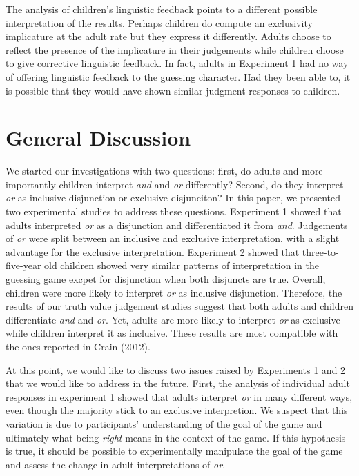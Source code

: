 \documentclass[10pt, letterpaper]{article}
\begin{document}
The analysis of children's linguistic feedback points to a different
possible interpretation of the results. Perhaps children do compute an
exclusivity implicature at the adult rate but they express it
differently. Adults choose to reflect the presence of the implicature in
their judgements while children choose to give corrective linguistic
feedback. In fact, adults in Experiment 1 had no way of offering
linguistic feedback to the guessing character. Had they been able to, it
is possible that they would have shown similar judgment responses to
children.

\section{General Discussion}\label{general-discussion}

We started our investigations with two questions: first, do adults and
more importantly children interpret \emph{and} and \emph{or}
differently? Second, do they interpret \emph{or} as inclusive
disjunction or exclusive disjunciton? In this paper, we presented two
experimental studies to address these questions. Experiment 1 showed
that adults interpreted \emph{or} as a disjunction and differentiated it
from \emph{and}. Judgements of \emph{or} were split between an inclusive
and exclusive interpretation, with a slight advantage for the exclusive
interpretation. Experiment 2 showed that three-to-five-year old children
showed very similar patterns of interpretation in the guessing game
excpet for disjunction when both disjuncts are true. Overall, children
were more likely to interpret \emph{or} as inclusive disjunction.
Therefore, the results of our truth value judgement studies suggest that
both adults and children differentiate \emph{and} and \emph{or}. Yet,
adults are more likely to interpret \emph{or} as exclusive while
children interpret it as inclusive. These results are most compatible
with the ones reported in Crain (2012).

At this point, we would like to discuss two issues raised by Experiments
1 and 2 that we would like to address in the future. First, the analysis
of individual adult responses in experiment 1 showed that adults
interpret \emph{or} in many different ways, even though the majority
stick to an exclusive interpretion. We suspect that this variation is
due to participants' understanding of the goal of the game and
ultimately what being \emph{right} means in the context of the game. If
this hypothesis is true, it should be possible to experimentally
manipulate the goal of the game and assess the change in adult
interpretations of \emph{or}.
\end{document}
